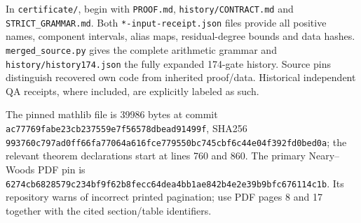 \documentclass[11pt,letterpaper]{article}
\theoremstyle{definition}\newtheorem{definition}[theorem]{Definition}
\theoremstyle{remark}\newtheorem{remark}[theorem]{Remark}
\newcommand{\codeu}[1]{\nolinkurl{#1}}
\begin{document}
In \codeu{certificate/}, begin with \codeu{PROOF.md}, \codeu{history/CONTRACT.md} and \codeu{STRICT_GRAMMAR.md}. Both \codeu{*-input-receipt.json} files provide all positive names, component intervals, alias maps, residual-degree bounds and data hashes. \codeu{merged_source.py} gives the complete arithmetic grammar and \codeu{history/history174.json} the fully expanded 174-gate history. Source pins distinguish recovered own code from inherited proof/data. Historical independent QA receipts, where included, are explicitly labeled as such.

The pinned mathlib file is 39986 bytes at commit \codeu{ac77769fabe23cb237559e7f56578dbead91499f}, SHA256 \codeu{993760c797ad0ff66fa77064a616fce779550bc745cbf6c44e04f392fd0bed0a}; the relevant theorem declarations start at lines 760 and 860. The primary Neary--Woods PDF pin is \codeu{6274cb6828579c234bf9f62b8fecc64dea4bb1ae842b4e2e39b9bfc676114c1b}. Its repository warns of incorrect printed pagination; use PDF pages 8 and 17 together with the cited section/table identifiers.
\end{document}
